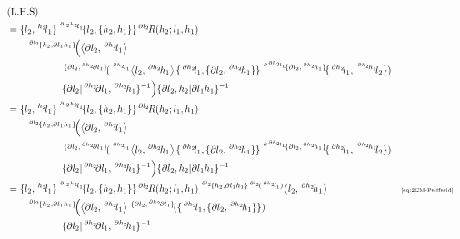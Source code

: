 \documentclass[11pt, reqno]{amsart} %
\newcommand{\act}[1]{\,\sp{#1}\!}
\theoremstyle{definition}
\theoremstyle{remark}
\numberwithin{equation}{section}
\begin{document}
\begin{align*}
  &(\text{L.H.S}) \\
  &= \{l_2,\act{h_2}l_1\}\act{\act{\partial l_2h_2}l_1}\{l_2,\{h_2,h_1\}\}\act{\partial l_2}R(h_2;l_1,h_1) \\
  &\qquad \act{\act{\partial l_2}\{h_2,\partial l_1h_1\}}\Bigl(\left<\partial l_2,\act{\partial h_2}l_1\right> \\
  &\hspace{2cm} \act{\{\partial l_2,\act{\partial h_2}\partial l_1\}}(\act{\act{\partial h_2}l_1}\left<l_2,\act{\partial h_2}h_1\right>\{\act{\partial h_2}l_1,\{\partial l_2,\act{\partial h_2}h_1\}\}\act{\act{\partial \act{\partial h_2}l_1}\{\partial l_2,\act{\partial h_2}h_1\}}\{\act{\partial h_2}l_1,\act{\act{\partial h_2}h_1}l_2\}) \\
  &\hspace{2cm} \{\partial l_2|\act{\partial h_2}\partial l_1,\act{\partial h_2}h_1\}^{-1}\Bigr)\{\partial l_2,h_2|\partial l_1h_1\}^{-1} \\
  &= \{l_2,\act{h_2}l_1\}\act{\act{\partial l_2h_2}l_1}\{l_2,\{h_2,h_1\}\}\act{\partial l_2}R(h_2;l_1,h_1) \\
  &\qquad \act{\act{\partial l_2}\{h_2,\partial l_1h_1\}}\Bigl(\left<\partial l_2,\act{\partial h_2}l_1\right> \\
  &\hspace{2cm} \act{\{\partial l_2,\act{\partial h_2}\partial l_1\}}(\act{\act{\partial h_2}l_1}\left<l_2,\act{\partial h_2}h_1\right>\{\act{\partial h_2}l_1,\{\partial l_2,\act{\partial h_2}h_1\}\}\act{\act{\partial \act{\partial h_2}l_1}\{\partial l_2,\act{\partial h_2}h_1\}}\{\act{\partial h_2}l_1,\act{\act{\partial h_2}h_1}l_2\}) \\
  &\hspace{2cm} \{\partial l_2|\act{\partial h_2}\partial l_1,\act{\partial h_2}h_1\}^{-1}\Bigr)\{\partial l_2,h_2|\partial l_1h_1\}^{-1} \\
  &= \{l_2,\act{h_2}l_1\}\act{\act{\partial l_2h_2}l_1}\{l_2,\{h_2,h_1\}\}\act{\partial l_2}R(h_2;l_1,h_1)\act{\act{\partial l_2}\{h_2,\partial l_1h_1\}\act{\partial l_2}(\act{\partial h_2}l_1)}\left<l_2,\act{\partial h_2}h_1\right> & &\text{\tiny \eqref{eq:2CM-Peifferid}} \\
  &\qquad \act{\act{\partial l_2}\{h_2,\partial l_1h_1\}}\Bigl(\left<\partial l_2,\act{\partial h_2}l_1\right>\act{\{\partial l_2,\act{\partial h_2}\partial l_1\}}(\{\act{\partial h_2}l_1,\{\partial l_2,\act{\partial h_2}h_1\}\}) \\
  &\hspace{2cm} \{\partial l_2|\act{\partial h_2}\partial l_1,\act{\partial h_2}h_1\}^{-1}

\end{align*}
\end{document}
